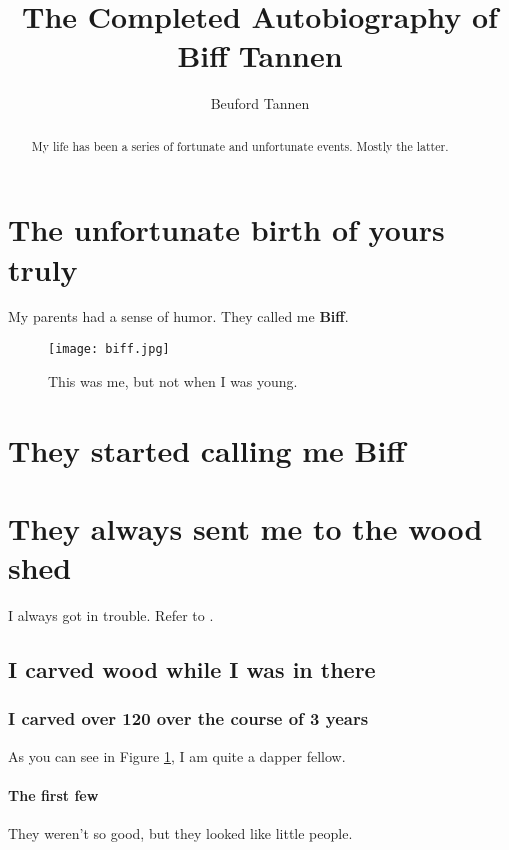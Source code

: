 \documentclass[a4paper,10pt]{article}
\title{The Completed Autobiography of Biff Tannen}
\author{Beuford Tannen}
\newcommand{\biff}[0]{\textbf{Biff}}
\begin{document}
  \maketitle

  \begin{abstract}
  My life has been a series of fortunate and unfortunate events. Mostly the latter.

  \end{abstract}

  \section{The unfortunate birth of yours truly}
  \label{sec:into}

  My parents had a sense of humor.  They called me \biff.

    \begin{figure}[H]
  \centering
      \texttt{[image: biff.jpg]}
      \caption{This was me, but not when I was young.}
      \label{fig:biff_the_man}
  \end{figure}


  \cite{yamauchi-nakano-funakoshi:2013:SIGDIAL}


  \section{They started calling me Biff}



  \section{They always sent me to the wood shed}
  \label{sec:birth}

  I always got in trouble. Refer to \cite{Kennington2014_coling}.
  \subsection{I carved wood while I was in there}

  \subsubsection{I carved over 120 over the course of 3 years}

  As you can see in Figure \ref{fig:biff_the_man}, I am quite a dapper fellow.

  \paragraph{The first few} They weren't so good, but they looked like little people.
\end{document}
